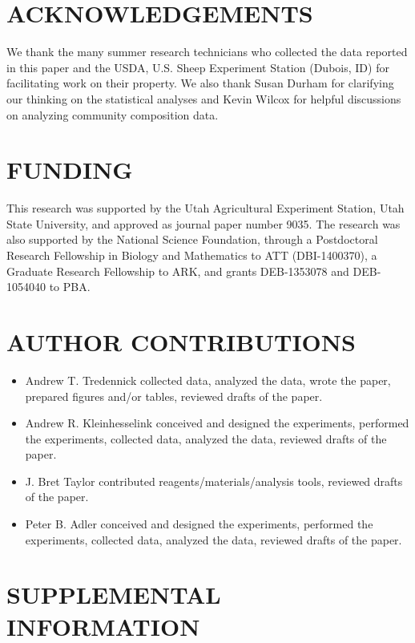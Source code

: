 \documentclass[fleqn,10pt,lineno]{wlpeerj} %
\begin{document}
\section{ACKNOWLEDGEMENTS}\label{acknowledgements}

We thank the many summer research technicians who collected the data
reported in this paper and the USDA, U.S. Sheep Experiment Station
(Dubois, ID) for facilitating work on their property. We also thank
Susan Durham for clarifying our thinking on the statistical analyses and
Kevin Wilcox for helpful discussions on analyzing community composition
data.

\section{FUNDING}\label{funding}

This research was supported by the Utah Agricultural Experiment Station,
Utah State University, and approved as journal paper number 9035. The
research was also supported by the National Science Foundation, through
a Postdoctoral Research Fellowship in Biology and Mathematics to ATT
(DBI-1400370), a Graduate Research Fellowship to ARK, and grants
DEB-1353078 and DEB-1054040 to PBA.

\section{AUTHOR CONTRIBUTIONS}\label{author-contributions}

\begin{itemize}
  \item Andrew T. Tredennick collected data, analyzed the data, wrote the paper, prepared figures and/or tables, reviewed drafts of the paper.
  \item Andrew R. Kleinhesselink conceived and designed the experiments, performed the experiments, collected data, analyzed the data, reviewed drafts of the paper.
  \item J. Bret Taylor contributed reagents/materials/analysis tools, reviewed drafts of the paper.
  \item Peter B. Adler conceived and designed the experiments, performed the experiments, collected data, analyzed the data, reviewed drafts of the paper.
\end{itemize}

\section{SUPPLEMENTAL INFORMATION}\label{supplemental-information}
\end{document}
